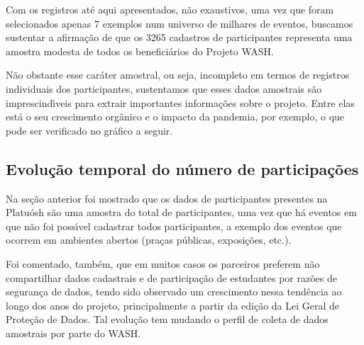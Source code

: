 \documentclass[
12pt,		%
openright,	%
twoside,  %
a4paper,			%
chapter=TITLE,		%
english,			%
french,				%
spanish,			%
brazil				%
]{USPSC-classe/USPSC_RedarTex}
\begin{document}
Com os registros at\'e aqui apresentados, n\~ao exaustivos, uma vez que foram selecionados apenas 7 exemplos num universo de milhares de eventos, buscamos sustentar a afirma\c{c}\~ao de que os 3265 cadastros de participantes representa uma amostra modesta de todos os benefici\'arios do Projeto WASH.










N\~ao obstante esse car\'ater amostral, ou seja, incompleto em termos de registros individuais dos participantes, sustentamos que esses dados amostrais s\~ao imprescind\'{\i}veis para extrair importantes informa\c{c}\~oes sobre o projeto. Entre elas est\'a o seu crescimento org\^anico e o impacto da pandemia, por exemplo, o que pode ser verificado no gr\'afico a seguir.










\subsection[Evolu\c{c}\~ao temporal do n\'umero de participa\c{c}\~oes]{Evolu\c{c}\~ao temporal do n\'umero de participa\c{c}\~oes}\label{Evolu\c{c}\~ao temporal do n\'umero de participa\c{c}\~oes}
Na se\c{c}\~ao anterior foi mostrado que os dados de participantes presentes na Platu\'osh s\~ao uma amostra do total de participantes, uma vez que h\'a eventos em que n\~ao foi poss\'{\i}vel cadastrar todos participantes, a exemplo dos eventos que ocorrem em ambientes abertos (pra\c{c}as p\'ublicas, exposi\c{c}\~oes, etc.).










Foi comentado, tamb\'em, que em muitos casos os parceiros preferem n\~ao compartilhar dados cadastrais e de participa\c{c}\~ao de estudantes por raz\~oes de seguran\c{c}a de dados, tendo sido observado um crescimento nessa tend\^encia ao longo dos anos do projeto, principalmente a partir da edi\c{c}\~ao da Lei Geral de Prote\c{c}\~ao de Dados. Tal evolu\c{c}\~ao tem mudando o perfil de coleta de dados amostrais por parte do WASH.
\end{document}
